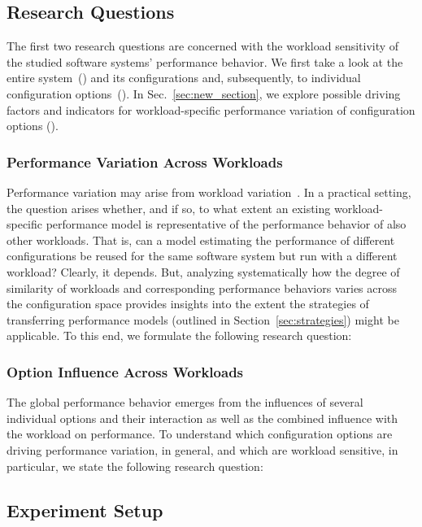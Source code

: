 {\subsection{Research Questions}
The first two research questions are concerned with the workload sensitivity of the studied software systems' performance behavior. We first take a look at the entire system~() and its configurations and, subsequently, to individual configuration options~(). In Sec.~\ref{sec:new_section}, we explore possible driving factors and indicators for workload-specific performance variation of configuration options ().

\subsubsection{Performance Variation Across Workloads}
Performance variation may arise from workload variation~\cite{benchmarking_book}. In a practical setting, the question arises whether, and if so, to what extent an existing workload-specific performance model is representative of the performance behavior of also other workloads. 
That is, can a model estimating the performance of different configurations be reused for the same software system but run with a different workload? 
Clearly, it depends. But, analyzing systematically how the degree of similarity of workloads and corresponding performance behaviors varies across the configuration space provides insights into the extent the strategies of transferring performance models (outlined in Section~\ref{sec:strategies}) might be applicable.
To this end, we formulate the following research question: 

\subsubsection{Option Influence Across Workloads}
The global performance behavior emerges from the influences of several individual options and their interaction as well as the combined influence with the workload on performance. To understand which configuration options are driving performance variation, in general, and which are workload sensitive, in particular, we state the following research question:


\subsection{Experiment Setup}\label{sec:setup}
}
